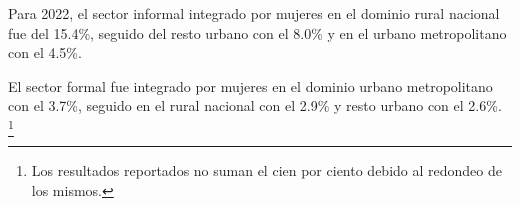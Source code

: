Para 2022, el  sector informal integrado por mujeres en el dominio rural nacional fue del 15.4\%, seguido del resto urbano con el 8.0\% y en el urbano metropolitano con el 4.5\%. 

El sector formal fue integrado por mujeres en el dominio urbano metropolitano con el 3.7\%, seguido en el rural nacional con el 2.9\% y resto urbano con el 2.6\%. \footnote{Los resultados reportados no suman el cien por ciento debido al redondeo de los mismos.}
